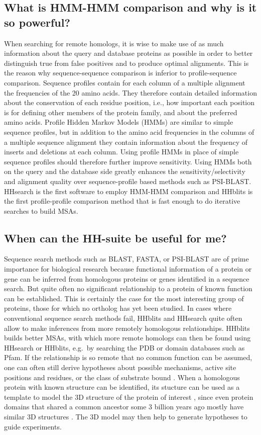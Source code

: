 \documentclass[11pt,a4paper]{article}
\begin{document}
\subsection{What is HMM-HMM comparison and why is it so powerful?}
When searching for remote homologs, it is wise to make use of as much information about the query and database proteins as possible in order to better distinguish true from false positives and to produce optimal alignments. This is the reason why sequence-sequence comparison is inferior to profile-sequence comparison. Sequence profiles contain for each column of a multiple alignment the frequencies of the 20 amino acids. They therefore contain detailed information about the conservation of each residue position, i.e., how important each position is for defining other members of the protein family, and about the preferred amino acids. Profile Hidden Markov Models (HMMs) are similar to simple sequence profiles, but in addition to the amino acid frequencies in the columns of a multiple sequence alignment they contain information about the frequency of inserts and deletions at each column. Using profile HMMs in place of simple sequence profiles should therefore further improve sensitivity. Using HMMs both on the query and the database side greatly enhances the sensitivity/selectivity and alignment quality over sequence-profile based methods such as PSI-BLAST. HHsearch is the first software to employ HMM-HMM comparison and HHblits is the first profile-profile comparison method that is fast enough to do iterative searches to build MSAs. 

\subsection{When can the HH-suite be useful for me?}
Sequence search methods such as BLAST, FASTA, or PSI-BLAST are of prime importance for biological research because functional information of a protein or gene can be inferred from homologous proteins or genes identified in a sequence search. But quite often no significant relationship to a protein of known function can be established. This is certainly the case for the most interesting group of proteins, those for which no ortholog has yet been studied. In cases where conventional sequence search methods fail, HHblits and HHsearch quite often allow to make inferences from more remotely homologous relationships. HHblits builds better MSAs, with which more remote homologs can then be found using HHsearch or HHblits, e.g.\ by searching the PDB or domain databases such as Pfam. If the relationship is so remote that no common function can be assumed, one can often still derive hypotheses about possible mechanisms, active site positions and residues, or the class of substrate bound \cite{Todd:2001, Pawlowski:2000}. When a homologous protein with known structure can be identified, its stucture can be used as a template to model the 3D structure of the protein of interest \cite{Rychlewski:1998}, since even protein domains that shared a common ancestor some 3 billion years ago mostly have similar 3D structures \cite{Kinch:2002,Soding:2006a,Alva:2010}. The 3D model may then help to generate hypotheses to guide experiments. 
\end{document}
